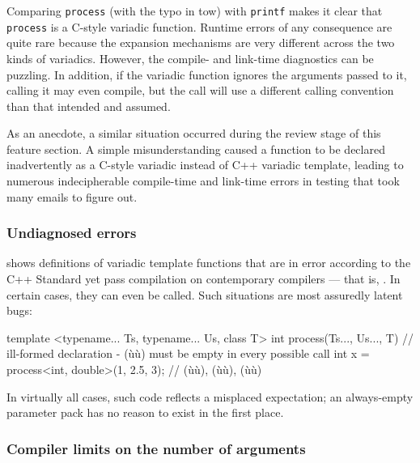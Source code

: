 \noindent Comparing \lstinline!process! (with the typo in tow) with \lstinline!printf!
makes it clear that \lstinline!process! is a C-style variadic function.
Runtime errors of any consequence are quite rare because the expansion
mechanisms are very different across the two kinds of variadics.
However, the compile- and link-time diagnostics can be puzzling. In
addition, if the variadic function ignores the arguments passed to it,
calling it may even compile, but the call will use a different calling
convention than that intended and assumed.

As an anecdote, a similar situation occurred during the review stage of
this feature section. A simple misunderstanding caused a function to be
declared inadvertently as a C-style variadic instead of C++ variadic
template, leading to numerous indecipherable compile-time and link-time
errors in testing that took many emails to figure out.

\subsubsection[Undiagnosed errors]{Undiagnosed errors}\label{undiagnosed-errors}

shows definitions of variadic template functions that are in error
according to the C++ Standard yet pass compilation on contemporary
compilers --- that is, . In certain cases, they can even
be called. Such situations are most assuredly latent bugs:

\begin{emcppslisting}
template <typename... Ts, typename... Us, class T>
int process(Ts..., Us..., T)
    // ill-formed declaration - (ù{}ù) must be empty in every possible call
int x = process<int, double>(1, 2.5, 3);
    // (ù{}ù), (ù{}ù), (ù{}ù)
\end{emcppslisting}
    

\noindent In virtually all cases, such code reflects a misplaced expectation; an
always-empty parameter pack has no reason to exist in the first place.

\subsubsection[Compiler limits on the number of arguments]{Compiler limits on the number of arguments}\label{compiler-limits-on-the-number-of-arguments}

